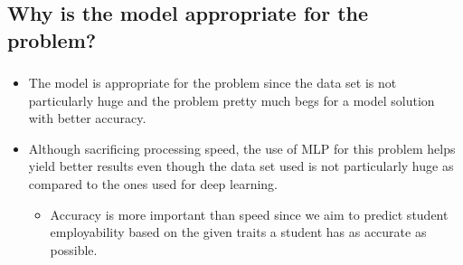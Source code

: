 \subsection{Why is the model appropriate for the problem?}
\begin{frame}
\frametitle{\subsecname}
	\begin{itemize}
		\item The model is appropriate for the problem since the data set is not particularly huge and the problem pretty much begs for a model solution with better accuracy.
		\item Although sacrificing processing speed, the use of MLP for this problem helps yield better results even though the data set used is not particularly huge as compared to the ones used for deep learning.
		\begin{itemize}
			\item Accuracy is more important than speed since we aim to predict student employability based on the given traits a student has as accurate as possible.
		\end{itemize}
	\end{itemize}
\end{frame}
